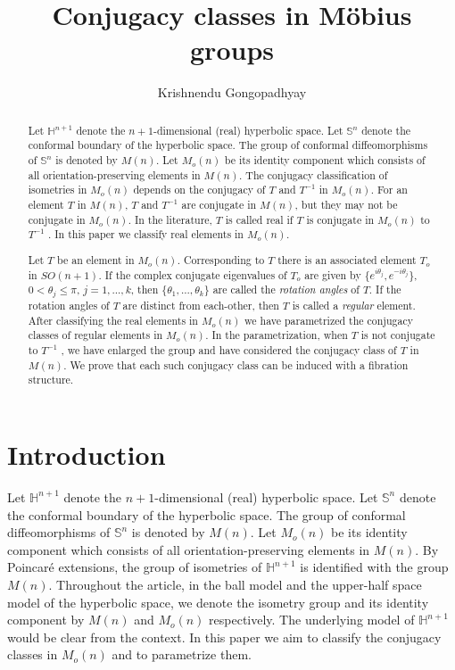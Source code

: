 \documentclass[11pt]{amsart}
\theoremstyle{definition}
\theoremstyle{remark}
\numberwithin{equation}{section}
\theoremstyle{plain}
\begin{document}
\title[Conjugacy classes in M\"obius groups]
{Conjugacy classes in M\"obius groups  }
\author[Krishnendu Gongopadhyay]{Krishnendu Gongopadhyay}
\address{Indian Institute of Science Education and Research (IISER) Mohali, Transit Campus: MGSIPAP Complex, Sector 26 Chandigarh 160 019, INDIA}
\begin{abstract}
Let ${\mathbb H}^{n+1}$ denote the $n + 1$-dimensional (real) hyperbolic space. Let ${\mathbb S}^{n}$
denote the conformal boundary of the hyperbolic space. The group of conformal diffeomorphisms of ${\mathbb S}^n$ is denoted by $M (n)$. Let $M_o (n)$ be its identity component which consists of all orientation-preserving elements in $M (n)$. The conjugacy classification of isometries in $M_o (n)$ depends on the conjugacy of $T$ and $T^{ -1}$ in $M_o (n)$. For an element $T$ in $M (n)$, $T$ and $T^{ -1}$ are conjugate in $M (n)$, but they may not be conjugate in $M_o (n)$. In the literature, $T$ is called real if $T$ is conjugate in $M_o (n)$ to $T^{ -1}$ . In this paper we classify real elements in $M_o (n)$. 

Let $T$ be an element in $M_o(n)$. Corresponding to $T$ there is an associated element $T_o$ in $SO(n+1)$. If the complex conjugate eigenvalues of $T_o$ are given by $\{e^{i\theta_j}, e^{-i\theta_j}\}$, $0 < \theta_j \leq \pi$, $j=1,...,k$, then $\{\theta_1,...,\theta_k\}$ are called the \emph{rotation angles} of $T$.  If the rotation angles of $T$ are distinct from each-other, then $T$ is called a \emph{regular} element. After classifying the real elements in $M_o (n)$  we have parametrized the conjugacy classes of regular elements in $M_o (n)$. In the parametrization, when $T$ is not conjugate to $T^{ -1}$ , we have enlarged the group and have considered the conjugacy class of $T$ in $M (n)$. We prove that each such conjugacy class can be induced with a fibration structure.
\end{abstract}
\maketitle

\section{Introduction}
Let ${\mathbb H}^{n+1}$ denote the $n+1$-dimensional (real) hyperbolic space. Let ${\mathbb S}^{n}$ denote the conformal boundary of the hyperbolic space. The group of conformal diffeomorphisms of ${\mathbb S}^{n}$ is denoted by $M(n)$. Let $M_o(n)$ be its identity component which consists of all orientation-preserving elements in $M(n)$.  By Poincar\'e extensions, the group of isometries of ${\mathbb H}^{n+1}$ is identified with the group $M(n)$. Throughout the article, in the ball model and the upper-half space model of the hyperbolic space, we denote the isometry group and its identity component by $M(n)$ and $M_o(n)$ respectively. The underlying model of ${\mathbb H}^{n+1}$ would be clear from the context. In this paper we aim to classify the conjugacy classes in $M_o(n)$ and to parametrize them. 
\end{document}
